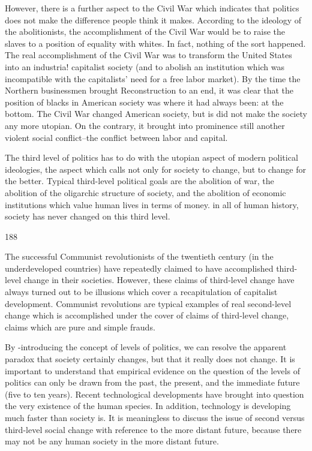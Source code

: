 \documentclass[10pt,twoside]{memoir}
\begin{document}
\begin{enumerate}
{{{However, there is a further aspect to the Civil War which indicates that 
politics does not make the difference people think it makes. According to 
the ideology of the abolitionists, the accomplishment of the Civil War would 
be to raise the slaves to a position of equality with whites. In fact, nothing of 
the sort happened. The real accomplishment of the Civil War was to 
transform the United States into an industria! capitalist society (and to 
abolish an institution which was incompatible with the capitalists' need for a 
free labor market). By the time the Northern businessmen brought 
Reconstruction to an end, it was clear that the position of blacks in 
American society was where it had always been: at the bottom. The Civil 
War changed American society, but is did not make the society any more 
utopian. On the contrary, it brought into prominence still another violent 
social conflict--the conflict between labor and capital. 

The third level of politics has to do with the utopian aspect of modern 
political ideologies, the aspect which calls not only for society to change, but 
to change for the better. Typical third-level political goals are the abolition 
of war, the abolition of the oligarchic structure of society, and the abolition 
of economic institutions which value human lives in terms of money. in all 
of human history, society has never changed on this third level. 


188 


The successful Communist revolutionists of the twentieth century (in 
the underdeveloped countries) have repeatedly claimed to have accomplished 
third-level change in their societies. However, these claims of third-level 
change have always turned out to be illusions which cover a recapitulation of 
capitalist development. Communist revolutions are typical examples of real 
second-level change which is accomplished under the cover of claims of 
third-level change, claims which are pure and simple frauds. 

By -introducing the concept of levels of politics, we can resolve the 
apparent paradox that society certainly changes, but that it really does not 
change. It is important to understand that empirical evidence on the 
question of the levels of politics can only be drawn from the past, the 
present, and the immediate future (five to ten years). Recent technological 
developments have brought into question the very existence of the human 
species. In addition, technology is developing much faster than society is. It 
is meaningless to discuss the issue of second versus third-level social change 
with reference to the more distant future, because there may not be any 
human society in the more distant future. 

}}}
\end{enumerate}
\end{document}
